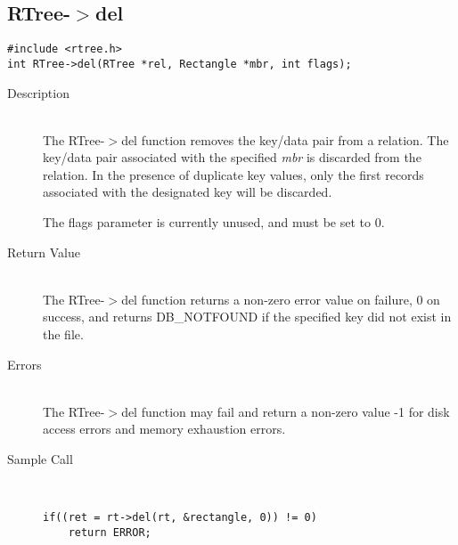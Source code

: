\documentclass[12pt]{article}
\def\cdf{\sf }
\def\cdf{\sf }
\newcommand{\RTREE}{{\small{\cdf RTree}}}
\newcommand{\DBNOTFOUND}{{\small{\cdf DB\_NOTFOUND}}}
\begin{document}
\subsection{{\RTREE}-$>$del}
\begin{verbatim}
#include <rtree.h>
int RTree->del(RTree *rel, Rectangle *mbr, int flags);
\end{verbatim}
\begin{description}
\item[Description]\ \\
  The {\RTREE}-$>$del function removes the key/data pair from a
  relation. The key/data pair associated with the specified {\em
  mbr} is discarded from the relation. In the presence of
  duplicate key values, only the first records associated with the
  designated key will be discarded.

  The flags parameter is currently unused, and must be set to 0.
\item[Return Value]\ \\
  The {\RTREE}-$>$del function returns a non-zero error value on
  failure, 0 on success, and returns {\DBNOTFOUND} if the specified key
  did not exist in the file.
\item[Errors]\ \\
  The {\RTREE}-$>$del function may fail and return a non-zero
  value -1 for disk access errors and memory exhaustion errors.
\item[Sample Call]\ 
\begin{verbatim}
if((ret = rt->del(rt, &rectangle, 0)) != 0)
    return ERROR;
\end{verbatim}
\end{description}

\newpage
\end{document}
